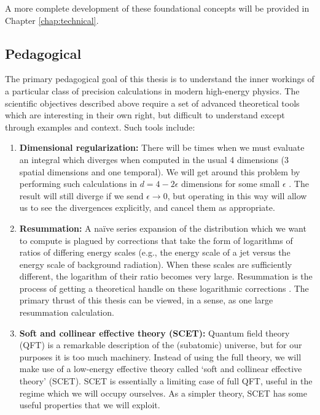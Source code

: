 \documentclass[../thesis.tex]{subfiles}
\begin{document}
	A more complete development of these foundational concepts will be provided in Chapter \ref{chap:technical}.


\subsection{Pedagogical}
	The primary pedagogical goal of this thesis is to understand the inner workings of a particular class of precision calculations in modern high-energy physics. The scientific objectives described above require a set of advanced theoretical tools which are interesting in their own right, but difficult to understand except through examples and context. Such tools include:
	\begin{enumerate}
		\item \textbf{Dimensional regularization:} There will be times when we must evaluate an integral which diverges when computed in the usual 4 dimensions (3 spatial dimensions and one temporal). We will get around this problem by performing such calculations in $d = 4 - 2\epsilon$ dimensions for some small $\epsilon$ \cite{schwartz_quantum_2014}. The result will still diverge if we send $\epsilon \to 0$, but operating in this way will allow us to see the divergences explicitly, and cancel them as appropriate.

		\item \textbf{Resummation:} A na\"ive series expansion of the distribution which we want to compute is plagued by corrections that take the form of logarithms of ratios of differing energy scales (e.g., the energy scale of a jet versus the energy scale of background radiation). When these scales are sufficiently different, the logarithm of their ratio becomes very large. Resummation is the process of getting a theoretical handle on these logarithmic corrections \cite{larkoski_elementary_2019-1}. The primary thrust of this thesis can be viewed, in a sense, as one large resummation calculation.

		\item \textbf{Soft and collinear effective theory (SCET):} Quantum field theory (QFT) is a remarkable description of the (subatomic) universe, but for our purposes it is too much machinery. Instead of using the full theory, we will make use of a low-energy effective theory called `soft and collinear effective theory' (SCET). SCET is essentially a limiting case of full QFT, useful in the regime which we will occupy ourselves. As a simpler theory, SCET has some useful properties that we will exploit.
	\end{enumerate}
\end{document}
